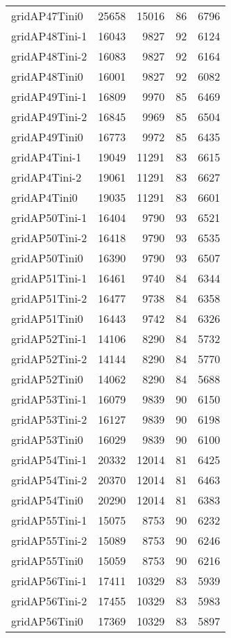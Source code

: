 \begin{longtable}{lrrrr}
gridAP47Tini0 & 25658 & 15016 & 86 & 6796 \\
gridAP48Tini-1 & 16043 & 9827 & 92 & 6124 \\
gridAP48Tini-2 & 16083 & 9827 & 92 & 6164 \\
gridAP48Tini0 & 16001 & 9827 & 92 & 6082 \\
gridAP49Tini-1 & 16809 & 9970 & 85 & 6469 \\
gridAP49Tini-2 & 16845 & 9969 & 85 & 6504 \\
gridAP49Tini0 & 16773 & 9972 & 85 & 6435 \\
gridAP4Tini-1 & 19049 & 11291 & 83 & 6615 \\
gridAP4Tini-2 & 19061 & 11291 & 83 & 6627 \\
gridAP4Tini0 & 19035 & 11291 & 83 & 6601 \\
gridAP50Tini-1 & 16404 & 9790 & 93 & 6521 \\
gridAP50Tini-2 & 16418 & 9790 & 93 & 6535 \\
gridAP50Tini0 & 16390 & 9790 & 93 & 6507 \\
gridAP51Tini-1 & 16461 & 9740 & 84 & 6344 \\
gridAP51Tini-2 & 16477 & 9738 & 84 & 6358 \\
gridAP51Tini0 & 16443 & 9742 & 84 & 6326 \\
gridAP52Tini-1 & 14106 & 8290 & 84 & 5732 \\
gridAP52Tini-2 & 14144 & 8290 & 84 & 5770 \\
gridAP52Tini0 & 14062 & 8290 & 84 & 5688 \\
gridAP53Tini-1 & 16079 & 9839 & 90 & 6150 \\
gridAP53Tini-2 & 16127 & 9839 & 90 & 6198 \\
gridAP53Tini0 & 16029 & 9839 & 90 & 6100 \\
gridAP54Tini-1 & 20332 & 12014 & 81 & 6425 \\
gridAP54Tini-2 & 20370 & 12014 & 81 & 6463 \\
gridAP54Tini0 & 20290 & 12014 & 81 & 6383 \\
gridAP55Tini-1 & 15075 & 8753 & 90 & 6232 \\
gridAP55Tini-2 & 15089 & 8753 & 90 & 6246 \\
gridAP55Tini0 & 15059 & 8753 & 90 & 6216 \\
gridAP56Tini-1 & 17411 & 10329 & 83 & 5939 \\
gridAP56Tini-2 & 17455 & 10329 & 83 & 5983 \\
gridAP56Tini0 & 17369 & 10329 & 83 & 5897 \\

\end{longtable}
